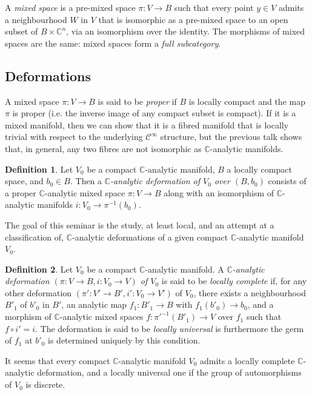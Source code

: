 \documentclass{article}
\theoremstyle{plain}
\theoremstyle{definition}
\newtheorem*{definition*}{Definition}
\newcommand{\CC}{\mathbb{C}}
\newcommand{\oldpage}[1]{\marginpar{\footnotesize$\Big\vert$ \textit{p.~#1}}}
\begin{document}
A \emph{mixed space} is a pre-mixed space $\pi\colon V\to B$ such that every point $y\in V$ admits a neighbourhood $W$ in $V$ that is isomorphic as a pre-mixed space to an open subset of $B\times\CC^n$, via an isomorphism over the identity.
The morphisms of mixed spaces are the same: mixed spaces form a \emph{full subcategory}.


\subsection{Deformations}
\label{II.3}

A mixed space $\pi\colon V\to B$ is said to be \emph{proper} if $B$ is locally compact and the map $\pi$ is proper (i.e. the inverse image of any compact subset is compact).
If it is a mixed manifold, then we can show that it is a fibred manifold that is locally trivial with respect to the underlying $\mathscr{C}^\infty$ structure, but the previous talk shows that, in general, any two fibres are not isomorphic as $\CC$-analytic manifolds.

\begin{definition*}
  Let $V_0$ be a compact $\CC$-analytic manifold, $B$ a locally compact space, and $b_0\in B$.
  Then a \emph{$\CC$-analytic deformation of $V_0$ over $(B,b_0)$} consists of a proper $\CC$-analytic mixed space $\pi\colon V\to B$
\oldpage{2-04}
  along with an isomorphism of $\CC$-analytic manifolds $i\colon V_0\to\pi^{-1}(b_0)$.
\end{definition*}

The goal of this seminar is the study, at least local, and an attempt at a classification of, $\CC$-analytic deformations of a given compact $\CC$-analytic manifold $V_0$.

\begin{definition*}
  Let $V_0$ be a compact $\CC$-analytic manifold.
  A \emph{$\CC$-analytic deformation $(\pi\colon V\to B,i\colon V_0\to V)$ of $V_0$} is said to be \emph{locally complete} if, for any other deformation $(\pi'\colon V'\to B',i'\colon V_0\to V')$ of $V_0$, there exists a neighbourhood $B'_1$ of $b'_0$ in $B'$, an analytic map $f_1\colon B'_1\to B$ with $f_1(b'_0)\to b_0$, and a morphism of $\CC$-analytic mixed spaces $f\colon {\pi'}^{-1}(B'_1)\to V$ over $f_1$ such that $f\circ i'=i$.
  The deformation is said to be \emph{locally universal} is furthermore the germ of $f_1$ at $b'_0$ is determined uniquely by this condition.
\end{definition*}

It seems that every compact $\CC$-analytic manifold $V_0$ admits a locally complete $\CC$-analytic deformation, and a locally universal one if the group of automorphisms of $V_0$ is discrete.
\end{document}
